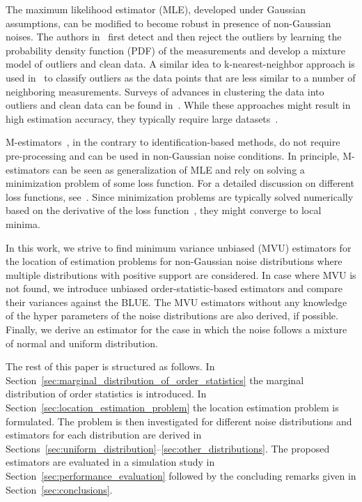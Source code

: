 \documentclass{article}
\begin{document}
The maximum likelihood estimator (MLE), developed under Gaussian assumptions, can be modified to become robust in presence of non-Gaussian noises. The authors in~\cite{conf:ICML_eskin_00} first detect and then reject the outliers by learning the probability density function (PDF) of the measurements and develop a mixture model of outliers and clean data. A similar idea to k-nearest-neighbor approach is used in~\cite{article:DMKD_chawla_10} to classify outliers as the data points that are less similar to a number of neighboring measurements. Surveys of advances in clustering the data into outliers and clean data can be found in~\cite{article:AIR_hodge_04,article:ITSP_yin_13,conf:ICASSP_fritsche_09}. While these approaches might result in high estimation accuracy, they typically require large datasets~\cite{article:ISPM_zoubir_12}.

M-estimators~\cite{book:RS_huber}, in the contrary to identification-based methods, do not require pre-processing and can be used in non-Gaussian noise conditions. In principle, M-estimators can be seen as generalization of MLE and rely on solving a minimization problem of some loss function. For a detailed discussion on different loss functions, see~\cite{book:RS_huber}. Since minimization problems are typically solved numerically based on the derivative of the loss function~\cite{book:RSTM_maronna}, they might converge to local minima.

In this work, we strive to find minimum variance unbiased (MVU) estimators for the location of estimation problems for non-Gaussian noise distributions where multiple distributions with positive support are considered.  In case where MVU is not found, we introduce unbiased order-statistic-based estimators and compare their variances against the BLUE. The MVU estimators without any knowledge of the hyper parameters of the noise distributions are also derived, if possible. Finally, we derive an estimator for the case in which the noise follows a mixture of normal and uniform distribution.
%

The rest of this paper is structured  as follows. In Section~\ref{sec:marginal_distribution_of_order_statistics} the marginal distribution of order statistics is introduced. In Section~\ref{sec:location_estimation_problem} the location estimation problem is formulated. The problem is then investigated for different noise distributions and estimators for each distribution are derived in Sections~\ref{sec:uniform_distribution}--\ref{sec:other_distributions}. The proposed estimators are evaluated in a simulation study in Section~\ref{sec:performance_evaluation} followed by the concluding remarks given in Section~\ref{sec:conclusions}.
\end{document}
